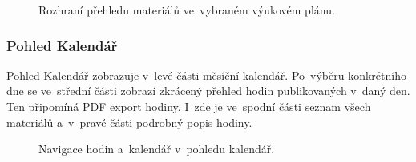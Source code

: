 \documentclass[male,czech,api_bc]{kitheses}
\begin{document}
\begin{figure}[H]
	\centering
	\caption{Rozhraní přehledu materiálů ve~vybraném výukovém plánu.}
	\label{fig:manual-8}
\end{figure}

\subsubsection{Pohled Kalendář}
Pohled Kalendář zobrazuje v~levé části měsíční kalendář. Po~výběru konkrétního dne se ve~střední části zobrazí zkrácený přehled hodin publikovaných v~daný den. Ten připomíná PDF export hodiny. I~zde je ve~spodní části seznam všech materiálů a~v~pravé části podrobný popis hodiny.

\begin{figure}[H]
	\centering
	\caption{Navigace hodin a~kalendář v~pohledu kalendář.}
	\label{fig:manual-9}
\end{figure}
\end{document}
